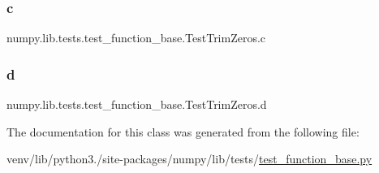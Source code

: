 \subsubsection{\texorpdfstring{c}{c}}
{\footnotesize\ttfamily numpy.\+lib.\+tests.\+test\+\_\+function\+\_\+base.\+Test\+Trim\+Zeros.\+c\hspace{0.3cm}{\ttfamily [static]}}

\mbox{\label{classnumpy_1_1lib_1_1tests_1_1test__function__base_1_1TestTrimZeros_afc1b3dec6ef7ec0261e89d282de970d6}} 
\subsubsection{\texorpdfstring{d}{d}}
{\footnotesize\ttfamily numpy.\+lib.\+tests.\+test\+\_\+function\+\_\+base.\+Test\+Trim\+Zeros.\+d\hspace{0.3cm}{\ttfamily [static]}}



The documentation for this class was generated from the following file\+:\begin{DoxyCompactItemize}
\item 
venv/lib/python3./site-\/packages/numpy/lib/tests/\hyperlink{lib_2tests_2test__function__base_8py}{test\+\_\+function\+\_\+base.\+py}\end{DoxyCompactItemize}
